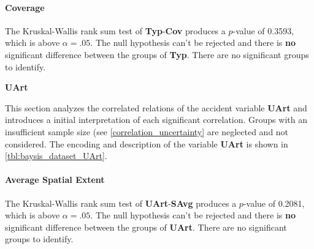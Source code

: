 \paragraph{Coverage}
The Kruskal-Wallis rank sum test of \textbf{Typ}-\textbf{Cov} produces a $p$-value of 0.3593, which is above $\alpha=.05$. The null hypothesis can't be rejected and there is \textbf{no} significant difference between the groups of \textbf{Typ}. There are no significant groups to identify.

\Large
\centerline{\textbf{UArt}}
\normalsize
This section analyzes the correlated relations of the accident variable \textbf{UArt} and introduces a initial interpretation of each significant correlation. Groups with an insufficient sample size (see \cref{correlation_uncertainty} are neglected and not considered. The encoding and description of the variable \textbf{UArt} is shown in \cref{tbl:baysis_dataset_UArt}. 

\paragraph{Average Spatial Extent}
The Kruskal-Wallis rank sum test of \textbf{UArt}-\textbf{SAvg} produces a $p$-value of 0.2081, which is above $\alpha=.05$. The null hypothesis can't be rejected and there is \textbf{no} significant difference between the groups of \textbf{UArt}. There are no significant groups to identify.

